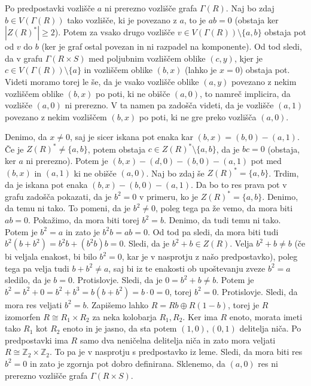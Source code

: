 \documentclass[a4paper, 12pt]{amsart}
\theoremstyle{definition} %
\theoremstyle{plain} %
\newcommand{\Z}{\mathbb Z}
\begin{document}
\proof
Po predpostavki vozlišče $a$ ni prerezno vozlišče grafa $\Gamma(R)$. Naj bo zdaj $b \in V(\Gamma(R))$ tako vozlišče, ki je povezano z $a$, to je $ab = 0$ (obstaja ker $|Z(R)^*|\ge 2$). Potem za vsako drugo vozlišče $v\in V(\Gamma(R)) \setminus \{a,b\}$ obstaja pot od $v$ do $b$ (ker je  graf ostal povezan in ni razpadel na komponente). Od tod sledi, da v grafu $\Gamma(R\times S)$ med poljubnim vozliščem oblike $(c,y)$, kjer je $c\in V( \Gamma(R))\setminus \{a\}$ in vozliščem oblike $(b,x)$ (lahko je $x=0$) obstaja pot. Videti moramo torej le še, da je vsako vozlišče oblike $(a,y)$ povezano z nekim vozliščem oblike $(b,x)$ po poti, ki ne obišče $(a,0)$, to namreč implicira, da vozlišče $(a,0)$ ni prerezno. V ta namen pa zadošča videti, da je vozlišče $(a,1)$ povezano z nekim vozliščem $(b,x)$ po poti, ki ne gre preko vozlišča $(a,0)$. 

Denimo, da $x\neq 0$, saj je sicer iskana pot enaka kar $(b,x) = (b,0) - (a,1)$.
Če je $Z(R)^* \neq \{a,b\}$, potem obstaja $c\in Z(R)^* \setminus \{a,b\}$, da je $bc=0$ (obstaja, ker $a$ ni prerezno). Potem je $(b,x) - (d,0) - (b,0) - (a,1)$ pot med $(b,x)$ in $(a,1)$ ki ne obišče $(a,0)$. Naj bo zdaj še $Z(R)^* = \{a,b\}$. Trdim, da je iskana pot enaka $(b,x) - (b,0) - (a,1)$. Da bo to res prava pot v grafu zadošča pokazati, da je $b^2 = 0$ v primeru, ko je $Z(R)^* = \{a,b\}$. Denimo, da temu ni tako. To pomeni, da je $b^2 \neq 0$, poleg tega pa že vemo, da mora biti $ab=0$. Pokažimo, da mora biti torej $b^2  = b$. Denimo, da tudi temu ni tako. Potem je $b^2 = a$ in zato je $b^2 b = a b = 0$. Od tod pa sledi, da mora biti tudi $b^2 (b+b^2) = b^2 b + (b^2 b)b  = 0$. Sledi, da je $b^2 + b\in Z(R)$. Velja $b^2 + b\neq b$ (če bi veljala enakost, bi bilo $b^2 = 0$, kar je v nasprotju z našo predpostavko), poleg tega pa velja tudi $b+b^2 \neq a$, saj bi iz te enakosti ob upoštevanju zveze $b^2 = a$ sledilo, da je $b = 0$. Protislovje. Sledi, da je $0=b^2 + b\neq b $. Potem je $b^2 = b^2 + 0 = b^2 + b^3 = b(b+b^2) = b\cdot 0 = 0$, torej $b^2 = 0$. Protislovje. Sledi, da mora res veljati $b^2 = b$. Zapišemo lahko $R=Rb \oplus R(1-b)$, torej je $R$ izomorfen $R\cong R_1\times R_2$ za neka kolobarja $R_1,R_2$. Ker ima $R$ enoto, morata imeti tako $R_1$ kot $R_2$ enoto in je jasno, da sta potem $(1,0),(0,1)$ delitelja niča. Po predpostavki ima $R$ samo dva neničelna delitelja niča in zato mora veljati $R\cong \Z_2 \times \Z_2$. To pa je v nasprotju s predpostavko iz leme. Sledi, da mora biti res $b^2 = 0$ in zato je zgornja pot dobro definirana. Sklenemo, da $(a,0)$ res ni prerezno vozlišče grafa $\Gamma(R\times S)$.
\endproof
\end{document}
